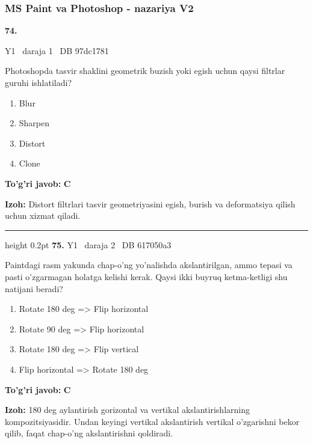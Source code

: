 \documentclass[10pt,a4paper,oneside]{article}
\begin{document}
\subsubsection{MS Paint va Photoshop - nazariya V2}
\hypertarget{q74}{\textbf{\color{ink}74.}}  {\color{muted}\scriptsize Y1 \textbullet\ daraja 1 \textbullet\ DB 97dc1781}
\par
Photoshopda tasvir shaklini geometrik buzish yoki egish uchun qaysi filtrlar guruhi ishlatiladi?
\begin{enumerate}[label=\Alph*),leftmargin=9mm]
\item Blur
\item Sharpen
\item Distort
\item Clone
\end{enumerate}
\begin{tcolorbox}[enhanced,breakable,colback=teal!4,colframe=teal!45!black,boxrule=0.45pt,arc=1.2mm,left=2.8mm,right=2.8mm,top=2mm,bottom=2mm,before skip=2mm,after skip=2mm]
\textbf{\color{teal}To'g'ri javob:} \textbf{C}
\par\smallskip
\textbf{Izoh:} Distort filtrlari tasvir geometriyasini egish, burish va deformatsiya qilish uchun xizmat qiladi.
\end{tcolorbox}
\vspace{2mm}\hrule height 0.2pt \vspace{4mm}
\hypertarget{q75}{\textbf{\color{ink}75.}}  {\color{muted}\scriptsize Y1 \textbullet\ daraja 2 \textbullet\ DB 617050a3}
\par
Paintdagi rasm yakunda chap-o'ng yo'nalishda akslantirilgan, ammo tepasi va pasti o'zgarmagan holatga kelishi kerak. Qaysi ikki buyruq ketma-ketligi shu natijani beradi?
\begin{enumerate}[label=\Alph*),leftmargin=9mm]
\item Rotate 180 deg  =\textgreater{} Flip horizontal
\item Rotate 90 deg  =\textgreater{} Flip horizontal
\item Rotate 180 deg  =\textgreater{} Flip vertical
\item Flip horizontal =\textgreater{} Rotate 180 deg 
\end{enumerate}
\begin{tcolorbox}[enhanced,breakable,colback=teal!4,colframe=teal!45!black,boxrule=0.45pt,arc=1.2mm,left=2.8mm,right=2.8mm,top=2mm,bottom=2mm,before skip=2mm,after skip=2mm]
\textbf{\color{teal}To'g'ri javob:} \textbf{C}
\par\smallskip
\textbf{Izoh:} 180 deg  aylantirish gorizontal va vertikal akslantirishlarning kompozitsiyasidir. Undan keyingi vertikal akslantirish vertikal o'zgarishni bekor qilib, faqat chap-o'ng akslantirishni qoldiradi.
\end{tcolorbox}
\end{document}
